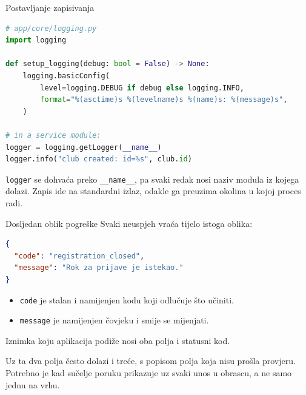 \begin{frame}[fragile]{Postavljanje zapisivanja}
\begin{lstlisting}[language=python]
# app/core/logging.py
import logging

def setup_logging(debug: bool = False) -> None:
    logging.basicConfig(
        level=logging.DEBUG if debug else logging.INFO,
        format="%(asctime)s %(levelname)s %(name)s: %(message)s",
    )

# in a service module:
logger = logging.getLogger(__name__)
logger.info("club created: id=%s", club.id)
\end{lstlisting}

\vspace{0.3em}
\texttt{logger} se dohvaća preko \texttt{\_\_name\_\_}, pa svaki redak nosi naziv modula iz kojega dolazi. Zapis ide na standardni izlaz, odakle ga preuzima okolina u kojoj proces radi.
\end{frame}

\begin{frame}[fragile]{Dosljedan oblik pogreške}
Svaki neuspjeh vraća tijelo istoga oblika:

\begin{lstlisting}[language=json]
{
  "code": "registration_closed",
  "message": "Rok za prijave je istekao."
}
\end{lstlisting}

\begin{itemize}
  \item \texttt{code} je stalan i namijenjen kodu koji odlučuje što učiniti.
  \item \texttt{message} je namijenjen čovjeku i smije se mijenjati.
\end{itemize}

\vspace{0.1em}
Iznimka koju aplikacija podiže nosi oba polja i statusni kod.

\vspace{0.1em}
\begin{konvencija}
Uz ta dva polja često dolazi i treće, s popisom polja koja nisu prošla provjeru. Potrebno je kad sučelje poruku prikazuje uz svaki unos u obrascu, a ne samo jednu na vrhu.
\end{konvencija}
\end{frame}

